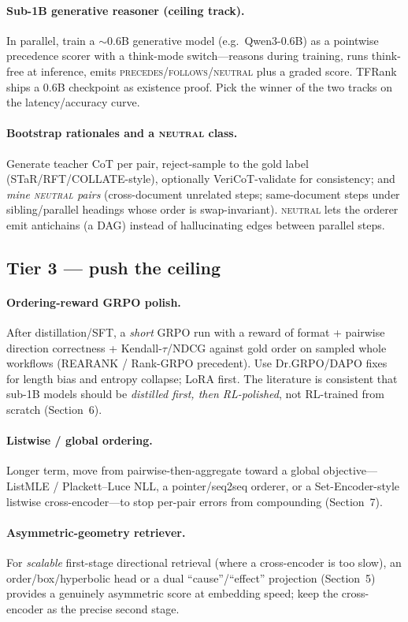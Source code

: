 \paragraph{Sub-1B generative reasoner (ceiling track).}
In parallel, train a $\sim$0.6B generative model (e.g.\ Qwen3-0.6B) as a pointwise
precedence scorer with a think-mode switch---reasons during training, runs think-free at
inference, emits \textsc{precedes/follows/neutral} plus a graded score. TFRank ships a 0.6B
checkpoint as existence proof. Pick the winner of the two tracks on the latency/accuracy
curve.
\paragraph{Bootstrap rationales and a \textsc{neutral} class.}
Generate teacher CoT per pair, reject-sample to the gold label (STaR/RFT/COLLATE-style),
optionally VeriCoT-validate for consistency; and \emph{mine \textsc{neutral} pairs}
(cross-document unrelated steps; same-document steps under sibling/parallel headings whose
order is swap-invariant). \textsc{neutral} lets the orderer emit antichains (a DAG) instead
of hallucinating edges between parallel steps.

\subsection{Tier 3 --- push the ceiling}
\paragraph{Ordering-reward GRPO polish.}
After distillation/SFT, a \emph{short} GRPO run with a reward of format + pairwise direction
correctness + Kendall-$\tau$/NDCG against gold order on sampled whole workflows (REARANK /
Rank-GRPO precedent). Use Dr.GRPO/DAPO fixes for length bias and entropy collapse; LoRA
first. The literature is consistent that sub-1B models should be \emph{distilled first, then
RL-polished}, not RL-trained from scratch (Section~6).
\paragraph{Listwise / global ordering.}
Longer term, move from pairwise-then-aggregate toward a global objective---ListMLE /
Plackett--Luce NLL, a pointer/seq2seq orderer, or a Set-Encoder-style listwise
cross-encoder---to stop per-pair errors from compounding (Section~7).
\paragraph{Asymmetric-geometry retriever.}
For \emph{scalable} first-stage directional retrieval (where a cross-encoder is too slow),
an order/box/hyperbolic head or a dual ``cause''/``effect'' projection (Section~5) provides a
genuinely asymmetric score at embedding speed; keep the cross-encoder as the precise
second stage.

